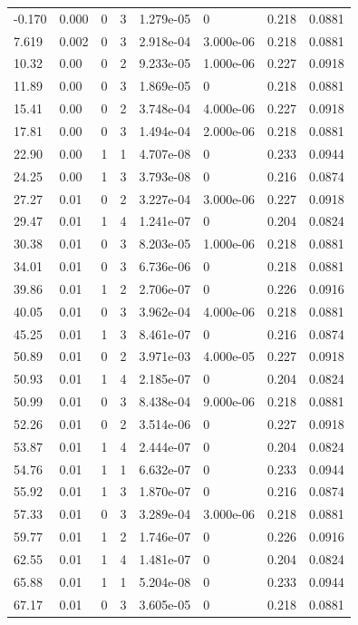\documentclass[preview]{standalone}
\begin{document}
{{\begin{tabular}{L{1.2cm}C{1.2cm} C{0.3cm}C{0.5cm} C{1.4cm}C{1.4cm} C{1.4cm}C{1.4cm}}
  -0.170  &  0.000  & 0     &  3 &  1.279e-05  & 0  & 0.218 &  0.0881   \\ 
  7.619  &  0.002  & 0     &  3 &  2.918e-04  & 3.000e-06  & 0.218 &  0.0881   \\ 
  10.32  &  0.00  & 0     &  2 &  9.233e-05  & 1.000e-06  & 0.227 &  0.0918   \\ 
  11.89  &  0.00  & 0     &  3 &  1.869e-05  & 0  & 0.218 &  0.0881   \\ 
  15.41  &  0.00  & 0     &  2 &  3.748e-04  & 4.000e-06  & 0.227 &  0.0918   \\ 
  17.81  &  0.00  & 0     &  3 &  1.494e-04  & 2.000e-06  & 0.218 &  0.0881   \\ 
  22.90  &  0.00  & 1     &  1 &  4.707e-08  & 0  & 0.233 &  0.0944   \\ 
  24.25  &  0.00  & 1     &  3 &  3.793e-08  & 0  & 0.216 &  0.0874   \\ 
  27.27  &  0.01  & 0     &  2 &  3.227e-04  & 3.000e-06  & 0.227 &  0.0918   \\ 
  29.47  &  0.01  & 1     &  4 &  1.241e-07  & 0  & 0.204 &  0.0824   \\ 
  30.38  &  0.01  & 0     &  3 &  8.203e-05  & 1.000e-06  & 0.218 &  0.0881   \\ 
  34.01  &  0.01  & 0     &  3 &  6.736e-06  & 0  & 0.218 &  0.0881   \\ 
  39.86  &  0.01  & 1     &  2 &  2.706e-07  & 0  & 0.226 &  0.0916   \\ 
  40.05  &  0.01  & 0     &  3 &  3.962e-04  & 4.000e-06  & 0.218 &  0.0881   \\ 
  45.25  &  0.01  & 1     &  3 &  8.461e-07  & 0  & 0.216 &  0.0874   \\ 
  50.89  &  0.01  & 0     &  2 &  3.971e-03  & 4.000e-05  & 0.227 &  0.0918   \\ 
  50.93  &  0.01  & 1     &  4 &  2.185e-07  & 0  & 0.204 &  0.0824   \\ 
  50.99  &  0.01  & 0     &  3 &  8.438e-04  & 9.000e-06  & 0.218 &  0.0881   \\ 
  52.26  &  0.01  & 0     &  2 &  3.514e-06  & 0  & 0.227 &  0.0918   \\ 
  53.87  &  0.01  & 1     &  4 &  2.444e-07  & 0  & 0.204 &  0.0824   \\ 
  54.76  &  0.01  & 1     &  1 &  6.632e-07  & 0  & 0.233 &  0.0944   \\ 
  55.92  &  0.01  & 1     &  3 &  1.870e-07  & 0  & 0.216 &  0.0874   \\ 
  57.33  &  0.01  & 0     &  3 &  3.289e-04  & 3.000e-06  & 0.218 &  0.0881   \\ 
  59.77  &  0.01  & 1     &  2 &  1.746e-07  & 0  & 0.226 &  0.0916   \\ 
  62.55  &  0.01  & 1     &  4 &  1.481e-07  & 0  & 0.204 &  0.0824   \\ 
  65.88  &  0.01  & 1     &  1 &  5.204e-08  & 0  & 0.233 &  0.0944   \\ 
  67.17  &  0.01  & 0     &  3 &  3.605e-05  & 0  & 0.218 &  0.0881   \\ 
\hline 
\end{tabular} 

}}
\end{document}
